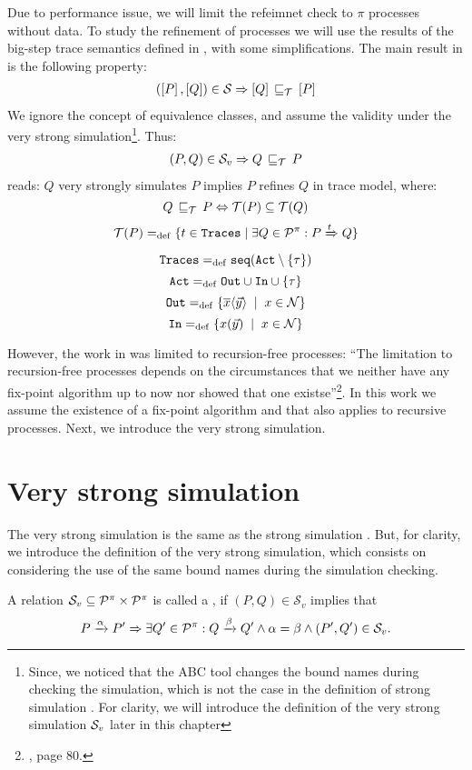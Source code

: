 Due to performance issue, we will limit the refeimnet check to $\pi$ processes without data. To study the refinement of \picalc{} processes we will use the results of the big-step trace semantics defined in \cite{gieseking}, with some simplifications. 
The main result in \cite{gieseking} is the following property:
\begin{align}
    (\ec{P},\ec{Q})\in{}\simu \Rightarrow \ec{Q} \refi \ec{P} \label{property1}
\end{align}
We ignore the concept of equivalence classes, and assume the validity under the very strong simulation\footnote{Since, we noticed that the ABC tool changes the bound names during checking the simulation, which is not the case in the definition of strong simulation . For clarity, we will introduce the definition of the very strong simulation $\mathcal{S}_v$ later in this chapter}. Thus:
\begin{align}
    (P,Q)\in{}\simuv \Rightarrow Q \refi P
\label{property2}
\end{align}
 reads: $Q$ very strongly simulates $P$ implies $P$ refines $Q$ in trace model, where:
\[Q\refi P \Leftrightarrow \Traces[P]\subseteq\Traces[Q]\]
\[\Traces[P] \define \{t\in \tr \mid \exists Q\in\procs: P \bigstep{t} Q\}\]
\[\tr \define \seqset{\actions\setminus\set{\tau}}\]
\[\actions\define\outA\cup\inA\cup\set{\tau}\]
\[\outA\define\set[x\in\names]{\out{x}{\vec{y}}}\]
\[\inA\define\set[x\in\names]{\inp{x}{\vec{y}}}\]

However, the work in \cite{gieseking} was limited to recursion-free processes: ``The limitation to recursion-free processes depends on the circumstances that we neither have any fix-point algorithm up to now nor showed that one existse''\footnote{\cite{gieseking}, page $80$.}. In this work we assume the existence of a fix-point algorithm and that  also applies to recursive processes.
Next, we introduce the very strong simulation.
\section{Very strong simulation}
\label{sec_failure-refinement}
The very strong simulation is the same as the strong simulation . But, for clarity, we introduce the definition of the very strong simulation, which consists on considering the use of the same bound names during the simulation checking.

\begin{definition}
\label{def_strong_sim}
A relation $\mathcal{S}_v\subseteq\mathcal P^{\pi}\times\mathcal P^{\pi}$ is called a , if $(P,Q)\in\mathcal{S}_v$ implies that
\[P \xrightarrow{\alpha} P' \Rightarrow \exists Q'\in\mathcal P^{\pi}: Q \xrightarrow{\beta} Q' \wedge \alpha = \beta \wedge (P',Q')\in\mathcal{S}_v.\]
\end{definition}

